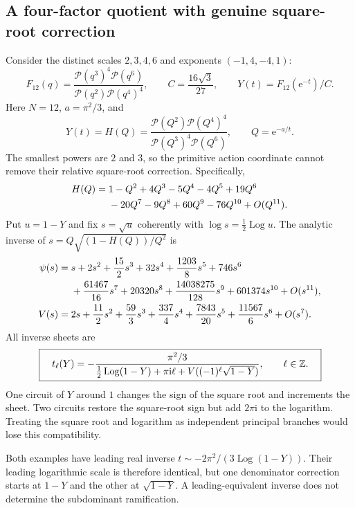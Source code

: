 \documentclass[11pt,a4paper]{article}
\numberwithin{equation}{section}
\theoremstyle{definition}\newtheorem{definition}[theorem]{Definition}
\theoremstyle{remark}\newtheorem{remark}[theorem]{Remark}
\newcommand{\ii}{\mathrm i}\newcommand{\e}{\mathrm e}
\newcommand{\Log}{\operatorname{Log}}\newcommand{\Li}{\operatorname{Li}}
\newcommand{\Poch}{\mathcal P}\newcommand{\F}{\mathcal F}
\begin{document}
\subsection{A four-factor quotient with genuine square-root correction}
Consider the distinct scales $2,3,4,6$ and exponents $(-1,4,-4,1)$:
\begin{equation}\label{eq:example12}
 F_{12}(q)=\frac{\Poch(q^3)^4\Poch(q^6)}
                         {\Poch(q^2)\Poch(q^4)^4},
 \qquad C=\frac{16\sqrt3}{27},\qquad
 Y(t)=F_{12}(\e^{-t})/C.
\end{equation}
Here $N=12$, $a=\pi^2/3$, and
\begin{equation}\label{eq:H12}
 Y(t)=H(Q)=\frac{\Poch(Q^2)\Poch(Q^4)^4}
                        {\Poch(Q^3)^4\Poch(Q^6)},\qquad Q=\e^{-a/t}.
\end{equation}
The smallest powers are $2$ and $3$, so the primitive action coordinate
cannot remove their relative square-root correction. Specifically,
\begin{align}
 H(Q)={}&1-Q^2+4Q^3-5Q^4-4Q^5+19Q^6\notag\\
        &-20Q^7-9Q^8+60Q^9-76Q^{10}+O(Q^{11}).
 \label{eq:H12-series}
\end{align}
Put $u=1-Y$ and fix $s=\sqrt u$ coherently with
$\log s=\tfrac12\Log u$. The analytic inverse of
$s=Q\sqrt{(1-H(Q))/Q^2}$ is
\begin{align}
 \psi(s)={}&s+2s^2+\frac{15}{2}s^3+32s^4+\frac{1203}{8}s^5
             +746s^6\notag\\
 &+\frac{61467}{16}s^7+20320s^8+
       \frac{14038275}{128}s^9+601374s^{10}+O(s^{11}),
 \label{eq:psi12}\\
 V(s)={}&2s+\frac{11}{2}s^2+\frac{59}{3}s^3+\frac{337}{4}s^4
          +\frac{7843}{20}s^5+\frac{11567}{6}s^6+O(s^7).
 \label{eq:V12}
\end{align}
All inverse sheets are
\begin{equation}\label{eq:t12}
 \boxed{\quad t_\ell(Y)=-\frac{\pi^2/3}
 {\tfrac12\Log(1-Y)+\pi\ii\ell+
                  V((-1)^\ell\sqrt{1-Y})},\qquad \ell\in\Z.\quad}
\end{equation}
One circuit of $Y$ around $1$ changes the sign of the square root and
increments the sheet. Two circuits restore the square-root sign but add
$2\pi\ii$ to the logarithm. Treating the square root and logarithm as
independent principal branches would lose this compatibility.

Both examples have leading real inverse
$t\sim-2\pi^2/(3\Log(1-Y))$. Their leading logarithmic scale is therefore
identical, but one denominator correction starts at $1-Y$ and the other
at $\sqrt{1-Y}$. A leading-equivalent inverse does not determine the
subdominant ramification.
\end{document}

